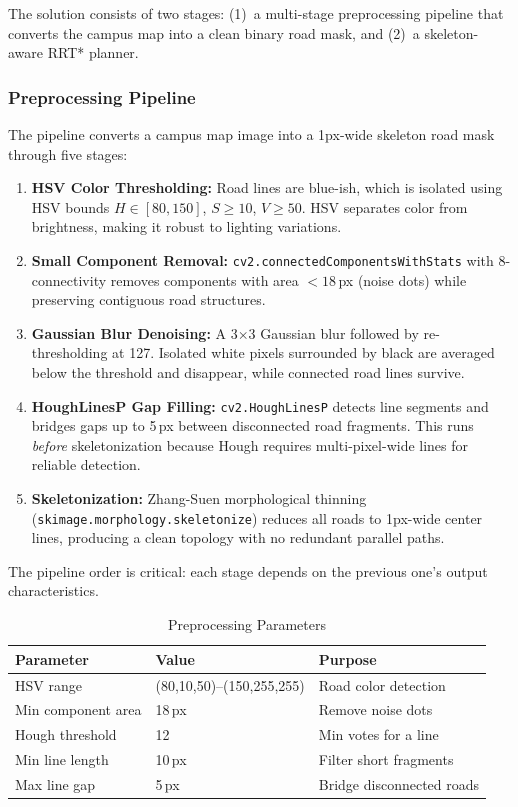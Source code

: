 \documentclass[conference,twocolumn]{IEEEtran}
\begin{document}
The solution consists of two stages: (1)~a multi-stage preprocessing pipeline that converts the campus map into a clean binary road mask, and (2)~a skeleton-aware RRT* planner.

\subsubsection{Preprocessing Pipeline}

The pipeline converts a campus map image into a 1px-wide skeleton road mask through five stages:

\begin{enumerate}
    \item \textbf{HSV Color Thresholding:} Road lines are blue-ish, which is isolated using HSV bounds $H \in [80, 150]$, $S \geq 10$, $V \geq 50$. HSV separates color from brightness, making it robust to lighting variations.
    
    \item \textbf{Small Component Removal:} \texttt{cv2.connectedComponentsWithStats} with 8-connectivity removes components with area $< 18$\,px (noise dots) while preserving contiguous road structures.
    
    \item \textbf{Gaussian Blur Denoising:} A 3$\times$3 Gaussian blur followed by re-thresholding at 127. Isolated white pixels surrounded by black are averaged below the threshold and disappear, while connected road lines survive.
    
    \item \textbf{HoughLinesP Gap Filling:} \texttt{cv2.HoughLinesP} detects line segments and bridges gaps up to 5\,px between disconnected road fragments. This runs \emph{before} skeletonization because Hough requires multi-pixel-wide lines for reliable detection.
    
    \item \textbf{Skeletonization:} Zhang-Suen morphological thinning (\texttt{skimage.morphology.skeletonize}) reduces all roads to 1px-wide center lines, producing a clean topology with no redundant parallel paths.
\end{enumerate}

The pipeline order is critical: each stage depends on the previous one's output characteristics.

\begin{table}[H]
\centering
\caption{Preprocessing Parameters}
\label{tab:preprocess_params}
\begin{tabular}{@{}lll@{}}
\toprule
\textbf{Parameter} & \textbf{Value} & \textbf{Purpose} \\
\midrule
HSV range & (80,10,50)–(150,255,255) & Road color detection \\
Min component area & 18\,px & Remove noise dots \\
Hough threshold & 12 & Min votes for a line \\
Min line length & 10\,px & Filter short fragments \\
Max line gap & 5\,px & Bridge disconnected roads \\
\bottomrule
\end{tabular}
\end{table}
\end{document}
